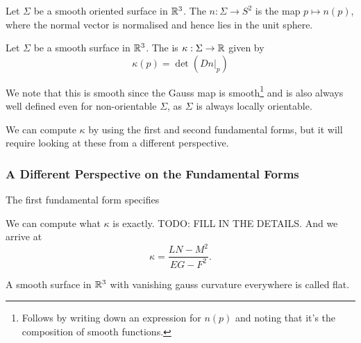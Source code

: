 \documentclass[a4paper]{article}
\begin{document}
\begin{definition}
    Let $\Sigma$ be a smooth oriented surface in $\mathbb{R}^3$. The  $n : \Sigma \rightarrow S^2$ is the map $p \mapsto n(p)$, where the normal vector is normalised and hence lies in the unit sphere.
\end{definition}



\begin{definition}
    Let $\Sigma$ be a smooth surface in $\mathbb{R}^3$. The  is $\kappa: \Sigma \rightarrow \mathbb{R}$ given by
    $$
    \kappa(p) = \det \left(\left.Dn\right|_p\right)
    $$
\end{definition}

We note that this is smooth since the Gauss map is smooth\footnote{Follows by writing down an expression for $n(p)$ and noting that it's the composition of smooth functions.} and is also always well defined even for non-orientable $\Sigma$, as $\Sigma$ is always locally orientable.

We can compute $\kappa$ by using the first and second fundamental forms, but it will require looking at these from a different perspective.

\subsubsection*{A Different Perspective on the Fundamental Forms}

The first fundamental form specifies 

We can compute what $\kappa$ is exactly.
{\color{red} TODO: FILL IN THE DETAILS}. And we arrive at
$$
\kappa = \frac{LN - M^2}{EG - F^2}.
$$


\begin{definition}
    A smooth surface in $\mathbb{R}^3$ with vanishing gauss curvature everywhere is called flat.
\end{definition}
\end{document}
